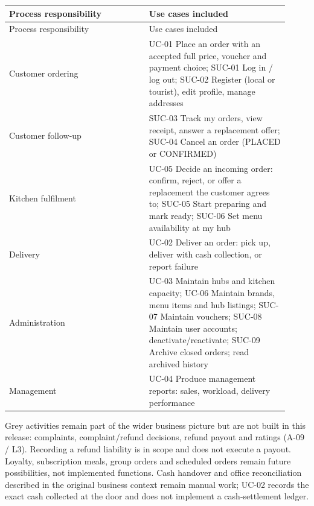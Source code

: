 \begin{longtable}{>{\raggedright\arraybackslash}p{0.4600\linewidth}>{\raggedright\arraybackslash}p{0.4600\linewidth}}
Process responsibility & Use cases included \\
\hline\endfirsthead
Process responsibility & Use cases included \\
\hline\endhead
Customer ordering & UC-01 Place an order with an accepted full price, voucher and payment choice; SUC-01 Log in / log out; SUC-02 Register (local or tourist), edit profile, manage addresses \\
Customer follow-up & SUC-03 Track my orders, view receipt, answer a replacement offer; SUC-04 Cancel an order (PLACED or CONFIRMED) \\
Kitchen fulfilment & UC-05 Decide an incoming order: confirm, reject, or offer a replacement the customer agrees to; SUC-05 Start preparing and mark ready; SUC-06 Set menu availability at my hub \\
Delivery & UC-02 Deliver an order: pick up, deliver with cash collection, or report failure \\
Administration & UC-03 Maintain hubs and kitchen capacity; UC-06 Maintain brands, menu items and hub listings; SUC-07 Maintain vouchers; SUC-08 Maintain user accounts; deactivate/reactivate; SUC-09 Archive closed orders; read archived history \\
Management & UC-04 Produce management reports: sales, workload, delivery performance \\
\end{longtable}
Grey activities remain part of the wider business picture but are not built in this release: complaints, complaint/refund decisions, refund payout and ratings (A-09 / L3). Recording a refund liability is in scope and does not execute a payout. Loyalty, subscription meals, group orders and scheduled orders remain future possibilities, not implemented functions. Cash handover and office reconciliation described in the original business context remain manual work; UC-02 records the exact cash collected at the door and does not implement a cash-settlement ledger.
